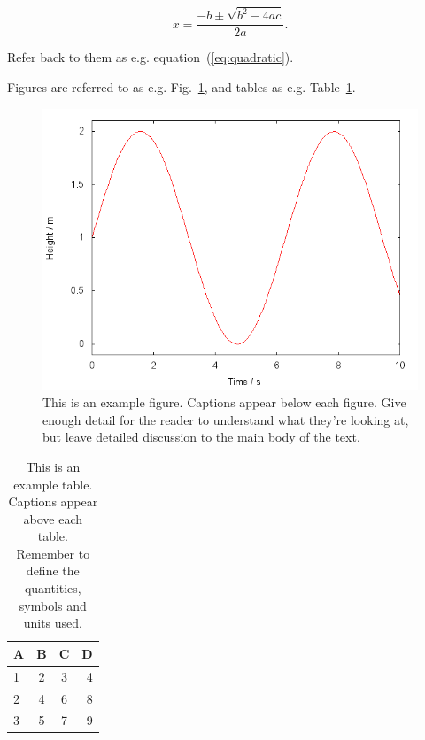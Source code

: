 \documentclass[fleqn,usenatbib]{mnras}
\begin{document}
\begin{equation}
    x=\frac{-b\pm\sqrt{b^2-4ac}}{2a}.
	\label{eq:quadratic}
\end{equation}

Refer back to them as e.g. equation~(\ref{eq:quadratic}).

Figures are referred to as e.g. Fig.~\ref{fig:example_figure}, and tables as
e.g. Table~\ref{tab:example_table}.

\begin{figure}
	\includegraphics[width=\columnwidth]{example}
    \caption{This is an example figure. Captions appear below each figure.
	Give enough detail for the reader to understand what they're looking at,
	but leave detailed discussion to the main body of the text.}
    \label{fig:example_figure}
\end{figure}

\begin{table}
	\centering
	\caption{This is an example table. Captions appear above each table.
	Remember to define the quantities, symbols and units used.}
	\label{tab:example_table}
	\begin{tabular}{lccr} %
		\hline
		A & B & C & D\\
		\hline
		1 & 2 & 3 & 4\\
		2 & 4 & 6 & 8\\
		3 & 5 & 7 & 9\\
		\hline
	\end{tabular}
\end{table}

\fi


\bsp	%
\label{lastpage}
\end{document}
